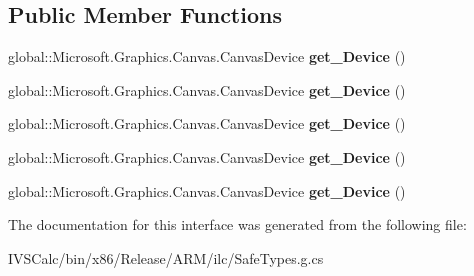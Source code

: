 \subsection*{Public Member Functions}
\begin{DoxyCompactItemize}
\item 
\mbox{\label{interface_microsoft_1_1_graphics_1_1_canvas_1_1_effects_1_1_i_effect_transfer_table3_d_a88502d3733fba8755fbbbf169fd08758}} 
global\+::\+Microsoft.\+Graphics.\+Canvas.\+Canvas\+Device {\bfseries get\+\_\+\+Device} ()
\item 
\mbox{\label{interface_microsoft_1_1_graphics_1_1_canvas_1_1_effects_1_1_i_effect_transfer_table3_d_a88502d3733fba8755fbbbf169fd08758}} 
global\+::\+Microsoft.\+Graphics.\+Canvas.\+Canvas\+Device {\bfseries get\+\_\+\+Device} ()
\item 
\mbox{\label{interface_microsoft_1_1_graphics_1_1_canvas_1_1_effects_1_1_i_effect_transfer_table3_d_a88502d3733fba8755fbbbf169fd08758}} 
global\+::\+Microsoft.\+Graphics.\+Canvas.\+Canvas\+Device {\bfseries get\+\_\+\+Device} ()
\item 
\mbox{\label{interface_microsoft_1_1_graphics_1_1_canvas_1_1_effects_1_1_i_effect_transfer_table3_d_a88502d3733fba8755fbbbf169fd08758}} 
global\+::\+Microsoft.\+Graphics.\+Canvas.\+Canvas\+Device {\bfseries get\+\_\+\+Device} ()
\item 
\mbox{\label{interface_microsoft_1_1_graphics_1_1_canvas_1_1_effects_1_1_i_effect_transfer_table3_d_a88502d3733fba8755fbbbf169fd08758}} 
global\+::\+Microsoft.\+Graphics.\+Canvas.\+Canvas\+Device {\bfseries get\+\_\+\+Device} ()
\end{DoxyCompactItemize}


The documentation for this interface was generated from the following file\+:\begin{DoxyCompactItemize}
\item 
I\+V\+S\+Calc/bin/x86/\+Release/\+A\+R\+M/ilc/Safe\+Types.\+g.\+cs\end{DoxyCompactItemize}
